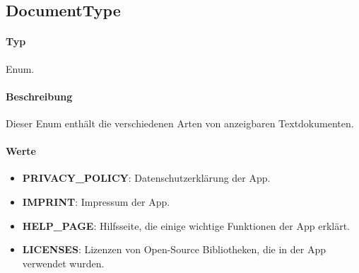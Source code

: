 \subsection{DocumentType}
\paragraph*{Typ}
Enum.
\paragraph*{Beschreibung}
Dieser Enum enthält die verschiedenen Arten von anzeigbaren Textdokumenten.

\paragraph*{Werte}
\begin{itemize}
    \item \textbf{PRIVACY\_POLICY}: Datenschutzerklärung der App.
    \item \textbf{IMPRINT}: Impressum der App.
    \item \textbf{HELP\_PAGE}: Hilfsseite, die einige wichtige Funktionen der App erklärt.
    \item \textbf{LICENSES}: Lizenzen von Open-Source Bibliotheken, die in der App verwendet wurden.
\end{itemize}
